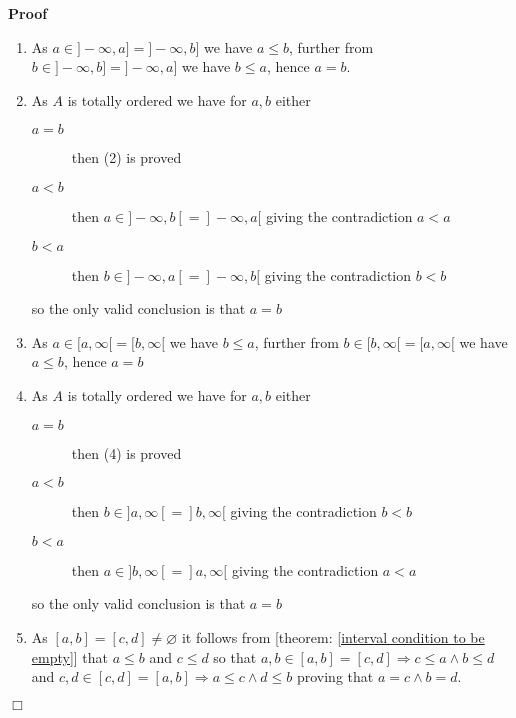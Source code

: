 \documentclass{book}
\newenvironment{proof}{\noindent\textbf{Proof\ }}{\hspace*{\fill}$\Box$\medskip}
\begin{document}
\begin{proof}
  
  \begin{enumerate}
    \item As $a \in] - \infty, a] =] - \infty, b]$ we have $a \leqslant b$,
    further from $b \in] - \infty, b] =] - \infty, a]$ we have $b \leqslant
    a$, hence $a = b$.
    
    \item As $A$ is totally ordered we have for $a, b$ either
    \begin{description}
      \item[$a = b$] then (2) is proved
      
      \item[$a < b$] then $a \in] - \infty, b [=] - \infty, a [$ giving the
      contradiction $a < a$
      
      \item[$b < a$] then $b \in] - \infty, a [=] - \infty, b [$ giving the
      contradiction $b < b$
    \end{description}
    so the only valid conclusion is that $a = b$
    
    \item As $a \in [a, \infty [= [b, \infty [$ we have $b \leqslant a$,
    further from $b \in [b, \infty [= [a, \infty [$ we have $a \leqslant b$,
    hence $a = b$
    
    \item As $A$ is totally ordered we have for $a, b$ either
    \begin{description}
      \item[$a = b$] then (4) is proved
      
      \item[$a < b$] then $b \in] a, \infty [=] b, \infty [$ giving the
      contradiction $b < b$
      
      \item[$b < a$] then $a \in] b, \infty [=] a, \infty [$ giving the
      contradiction $a < a$
    \end{description}
    so the only valid conclusion is that $a = b$
    
    \item As $[a, b] = [c, d] \neq \varnothing$ it follows from [theorem:
    \ref{interval condition to be empty}] that $a \leqslant b$ and $c
    \leqslant d$ so that $a, b \in [a, b] = [c, d] \Rightarrow c \leqslant a
    \wedge b \leqslant d$ and $c, d \in [c, d] = [a, b] \Rightarrow a
    \leqslant c \wedge d \leqslant b$ proving that $a = c \wedge b = d$.
    

\end{enumerate}
\end{proof}
\end{document}
